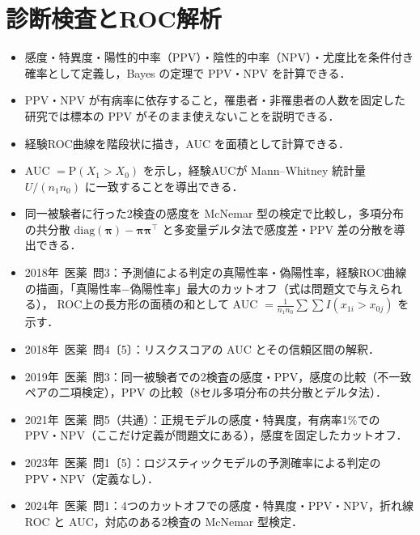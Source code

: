 \documentclass[a4paper,11pt,openany]{ltjsbook}
\newcommand{\kakomon}[2]{\mbox{#1年 医薬 問#2}}
\newcommand{\Prob}{\mathrm{P}}
\newcommand{\transp}{^{\top}}
\begin{document}
\chapter{診断検査とROC解析}\label{ch:05}

\begin{goalbox}
\begin{itemize}
\item 感度・特異度・陽性的中率（PPV）・陰性的中率（NPV）・尤度比を条件付き確率として定義し，Bayes の定理で PPV・NPV を計算できる．
\item PPV・NPV が有病率に依存すること，罹患者・非罹患者の人数を固定した研究では標本の PPV がそのまま使えないことを説明できる．
\item 経験ROC曲線を階段状に描き，AUC を面積として計算できる．
\item AUC $=\Prob(X_1>X_0)$ を示し，経験AUCが Mann--Whitney 統計量 $U/(n_1n_0)$ に一致することを導出できる．
\item 同一被験者に行った2検査の感度を McNemar 型の検定で比較し，多項分布の共分散 $\mathrm{diag}(\bm\pi)-\bm\pi\bm\pi\transp$ と多変量デルタ法で感度差・PPV 差の分散を導出できる．
\end{itemize}
\end{goalbox}

\begin{exambox}
\begin{itemize}
\item \kakomon{2018}{3}：予測値による判定の真陽性率・偽陽性率，経験ROC曲線の描画，「真陽性率$-$偽陽性率」最大のカットオフ（式は問題文で与えられる），
      ROC上の長方形の面積の和として AUC $=\frac{1}{n_1n_0}\sum\sum I(x_{1i}>x_{0j})$ を示す．
\item \kakomon{2018}{4}〔5〕：リスクスコアの AUC とその信頼区間の解釈．
\item \kakomon{2019}{3}：同一被験者での2検査の感度・PPV，感度の比較（不一致ペアの二項検定），PPV の比較（8セル多項分布の共分散とデルタ法）．
\item \kakomon{2021}{5}（共通）：正規モデルの感度・特異度，有病率1\%での PPV・NPV（ここだけ定義が問題文にある），感度を固定したカットオフ．
\item \kakomon{2023}{1}〔5〕：ロジスティックモデルの予測確率による判定の PPV・NPV（定義なし）．
\item \kakomon{2024}{1}：4つのカットオフでの感度・特異度・PPV・NPV，折れ線 ROC と AUC，対応のある2検査の McNemar 型検定．
\end{itemize}
\end{exambox}
\end{document}

